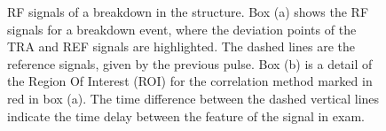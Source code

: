  \begin{figure}
\centering
   \hspace{1mm}
\caption{RF signals of a breakdown in the structure. Box (a) shows the RF signals for a breakdown event, where the deviation points of the TRA and REF signals are highlighted. The dashed lines are the reference signals, given by the previous pulse. Box (b) is a detail of the Region Of Interest (ROI) for the correlation method marked in red in box (a). The time difference between the dashed vertical lines indicate the time delay between the feature of the signal in exam.}
 \label{dev_pt}
 \end{figure}


